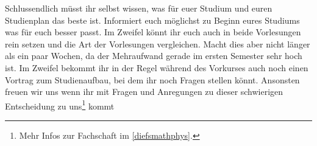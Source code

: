 Schlussendlich müsst ihr selbst wissen, was für euer Studium und euren Studienplan das beste ist. Informiert euch möglichst zu Beginn eures Studiums was für euch besser passt. Im Zweifel könnt ihr euch auch in beide Vorlesungen rein setzen und die Art der Vorlesungen vergleichen. Macht dies aber nicht länger als ein paar Wochen, da der Mehraufwand gerade im ersten Semester sehr hoch ist. Im Zweifel bekommt ihr in der Regel während des Vorkurses auch noch einen Vortrag zum Studienaufbau, bei dem ihr noch Fragen stellen könnt. Ansonsten freuen wir uns wenn ihr mit Fragen und Anregungen zu dieser schwierigen Entscheidung zu uns\footnote{Mehr Infos zur Fachschaft im \autoref{diefsmathphys}.} kommt
